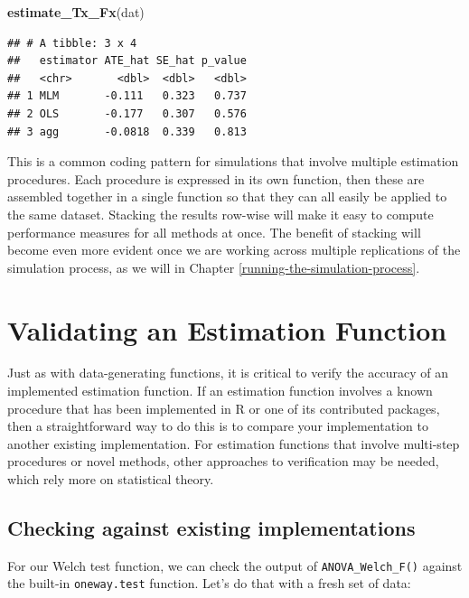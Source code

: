 \documentclass[
]{book}
\newenvironment{Shaded}{\begin{snugshade}}{\end{snugshade}}
\newcommand{\FunctionTok}[1]{\textcolor[rgb]{0.13,0.29,0.53}{\textbf{#1}}}
\newcommand{\NormalTok}[1]{#1}
\begin{document}
\begin{Shaded}
\begin{Highlighting}[]
\FunctionTok{estimate\_Tx\_Fx}\NormalTok{(dat)}
\end{Highlighting}
\end{Shaded}

\begin{verbatim}
## # A tibble: 3 x 4
##   estimator ATE_hat SE_hat p_value
##   <chr>       <dbl>  <dbl>   <dbl>
## 1 MLM       -0.111   0.323   0.737
## 2 OLS       -0.177   0.307   0.576
## 3 agg       -0.0818  0.339   0.813
\end{verbatim}

This is a common coding pattern for simulations that involve multiple estimation procedures.
Each procedure is expressed in its own function, then these are assembled together in a single function so that they can all easily be applied to the same dataset.
Stacking the results row-wise will make it easy to compute performance measures for all methods at once.
The benefit of stacking will become even more evident once we are working across multiple replications of the simulation process, as we will in Chapter \ref{running-the-simulation-process}.

\section{Validating an Estimation Function}\label{validating-an-estimation-function}

Just as with data-generating functions, it is critical to verify the accuracy of an implemented estimation function.
If an estimation function involves a known procedure that has been implemented in R or one of its contributed packages, then a straightforward way to do this is to compare your implementation to another existing implementation.
For estimation functions that involve multi-step procedures or novel methods, other approaches to verification may be needed, which rely more on statistical theory.

\subsection{Checking against existing implementations}\label{checking-against-existing-implementations}

For our Welch test function, we can check the output of \texttt{ANOVA\_Welch\_F()} against the built-in \texttt{oneway.test} function. Let's do that with a fresh set of data:
\end{document}
